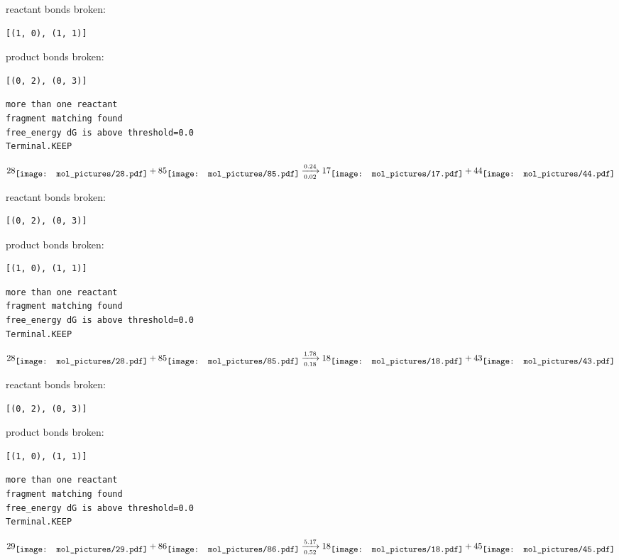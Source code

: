 \documentclass{article}
\begin{document}
reactant bonds broken:\begin{verbatim}
[(1, 0), (1, 1)]
\end{verbatim}
product bonds broken:\begin{verbatim}
[(0, 2), (0, 3)]
\end{verbatim}




\vspace{1cm}
\begin{verbatim}
more than one reactant
fragment matching found
free_energy dG is above threshold=0.0
Terminal.KEEP
\end{verbatim}
$$
28
\raisebox{-.5\height}{\texttt{[image: mol\_pictures/28.pdf]}}
+
85
\raisebox{-.5\height}{\texttt{[image: mol\_pictures/85.pdf]}}
\xrightarrow[0.02]{0.24}
17
\raisebox{-.5\height}{\texttt{[image: mol\_pictures/17.pdf]}}
+
44
\raisebox{-.5\height}{\texttt{[image: mol\_pictures/44.pdf]}}
$$


reactant bonds broken:\begin{verbatim}
[(0, 2), (0, 3)]
\end{verbatim}
product bonds broken:\begin{verbatim}
[(1, 0), (1, 1)]
\end{verbatim}




\vspace{1cm}
\begin{verbatim}
more than one reactant
fragment matching found
free_energy dG is above threshold=0.0
Terminal.KEEP
\end{verbatim}
$$
28
\raisebox{-.5\height}{\texttt{[image: mol\_pictures/28.pdf]}}
+
85
\raisebox{-.5\height}{\texttt{[image: mol\_pictures/85.pdf]}}
\xrightarrow[0.18]{1.78}
18
\raisebox{-.5\height}{\texttt{[image: mol\_pictures/18.pdf]}}
+
43
\raisebox{-.5\height}{\texttt{[image: mol\_pictures/43.pdf]}}
$$


reactant bonds broken:\begin{verbatim}
[(0, 2), (0, 3)]
\end{verbatim}
product bonds broken:\begin{verbatim}
[(1, 0), (1, 1)]
\end{verbatim}




\vspace{1cm}
\begin{verbatim}
more than one reactant
fragment matching found
free_energy dG is above threshold=0.0
Terminal.KEEP
\end{verbatim}
$$
29
\raisebox{-.5\height}{\texttt{[image: mol\_pictures/29.pdf]}}
+
86
\raisebox{-.5\height}{\texttt{[image: mol\_pictures/86.pdf]}}
\xrightarrow[0.52]{5.17}
18
\raisebox{-.5\height}{\texttt{[image: mol\_pictures/18.pdf]}}
+
45
\raisebox{-.5\height}{\texttt{[image: mol\_pictures/45.pdf]}}
$$
\end{document}
